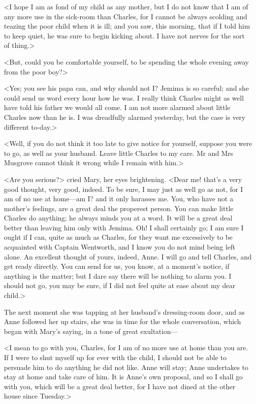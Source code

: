 <I hope I am as fond of my child as any mother, but I do not know that I am of any more use in the sick-room than Charles, for I cannot be always scolding and teazing the poor child when it is ill; and you saw, this morning, that if I told him to keep quiet, he was sure to begin kicking about. I have not nerves for the sort of thing.>

<But, could you be comfortable yourself, to be spending the whole evening away from the poor boy?>

<Yes; you see his papa can, and why should not I\@? Jemima is so careful; and she could send us word every hour how he was. I really think Charles might as well have told his father we would all come. I am not more alarmed about little Charles now than he is. I was dreadfully alarmed yesterday, but the case is very different to-day.>

<Well, if you do not think it too late to give notice for yourself, suppose you were to go, as well as your husband. Leave little Charles to my care. Mr and Mrs Musgrove cannot think it wrong while I remain with him.>

<Are you serious?> cried Mary, her eyes brightening. <Dear me! that's a very good thought, very good, indeed. To be sure, I may just as well go as not, for I am of no use at home—am I\@? and it only harasses me. You, who have not a mother's feelings, are a great deal the properest person. You can make little Charles do anything; he always minds you at a word. It will be a great deal better than leaving him only with Jemima. Oh! I shall certainly go; I am sure I ought if I can, quite as much as Charles, for they want me excessively to be acquainted with Captain Wentworth, and I know you do not mind being left alone. An excellent thought of yours, indeed, Anne. I will go and tell Charles, and get ready directly. You can send for us, you know, at a moment's notice, if anything is the matter; but I dare say there will be nothing to alarm you. I should not go, you may be sure, if I did not feel quite at ease about my dear child.>

The next moment she was tapping at her husband's dressing-room door, and as Anne followed her up stairs, she was in time for the whole conversation, which began with Mary's saying, in a tone of great exultation—

<I mean to go with you, Charles, for I am of no more use at home than you are. If I were to shut myself up for ever with the child, I should not be able to persuade him to do anything he did not like. Anne will stay; Anne undertakes to stay at home and take care of him. It is Anne's own proposal, and so I shall go with you, which will be a great deal better, for I have not dined at the other house since Tuesday.>

